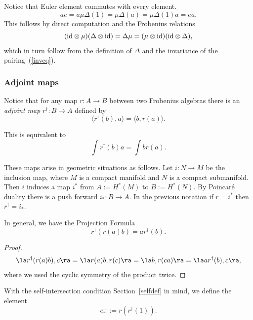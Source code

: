 Notice that Euler element commutes with every element.
\begin{equation*}
ae=a\mu\Delta(1)=\mu\Delta(a)=\mu\Delta(1)a=ea.
\end{equation*}
This follows by direct computation and the Frobenius relations
\begin{equation*}
({\rm id}\otimes \mu)(\Delta\otimes {\rm id})=\Delta\mu=(\mu\otimes
{\rm id})({\rm id}\otimes \Delta),
\end{equation*}
which in turn follow from the def\/inition of $\Delta$ and the
invariance of the pairing~(\ref{inveq}).

\subsubsection{Adjoint maps}
Notice that for any map $r:A\to B$ between two Frobenius algebras
there is an {\em adjoint map} $r^{\dagger}:B\to A$ def\/ined by
\begin{equation*}
 \langle r^{\dagger}(b) ,a  \rangle =\langle b,r(a)\rangle.
\end{equation*}

This is equivalent to
\begin{equation}
\label{adjointeq}
 \int r^{\dagger}(b)a  =\int br(a).
\end{equation}

These maps arise
in geometric situations as follows. Let $i:N \to M $ be the inclusion map, where $M$ is a compact manifold and $N$ is a compact submanifold. Then $i$ induces a map $i^*$ from
$A:=H^*(M)$ to $B:=H^*(N)$. By Poincar\'e duality there is a push forward $i_*:B\to A$. In the previous notation if  $r=i^*$ then $r^{\dagger}=i_*$.


\begin{lem}In general, we have the Projection Formula
\begin{equation*}
r^{\dagger}(r(a)b)=ar^{\dagger}(b). %
\end{equation*}
\end{lem}
\begin{proof}
\begin{gather*}
\la r^{\dagger}(r(a)b), c\ra = \la r(a)b,r(c)\ra = \la b, r(ca)\ra = \la ar^{\dagger}(b),c\ra,
\end{gather*}
where we used the cyclic symmetry of the product twice.
\end{proof}

With  the self-intersection condition Section~\ref{selfdef} in mind, we def\/ine the element
\begin{equation*}
e_r^{\perp}:=r (r^{\dagger}(1)).
\end{equation*}

